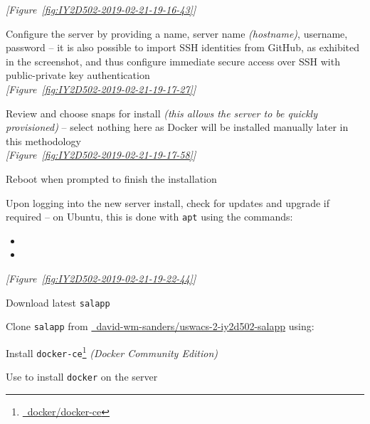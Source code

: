 \begin{methodology0}
\begin{methodology1}
      \textcolor{deep-gray}{\textit{[Figure~\ref{fig:IY2D502-2019-02-21-19-16-43}]}}
      \item Configure the server by providing a name, server name \textit{(hostname)}, username, password -- it is also possible to import SSH identities from GitHub, as exhibited in the screenshot, and thus configure immediate secure access over SSH with public-private key authentication\\
      \textcolor{deep-gray}{\textit{[Figure~\ref{fig:IY2D502-2019-02-21-19-17-27}]}}
      \item Review and choose snaps for install \textit{(this allows the server to be quickly provisioned)} -- select nothing here as Docker will be installed manually later in this methodology\\
      \textcolor{deep-gray}{\textit{[Figure~\ref{fig:IY2D502-2019-02-21-19-17-58}]}}
      \item Reboot when prompted to finish the installation
      \item Upon logging into the new server install, check for updates and upgrade if required -- on Ubuntu, this is done with \texttt{apt} using the commands:
        \begin{itemize}
          \item {}
          \item {}
        \end{itemize}
      \textcolor{deep-gray}{\textit{[Figure~\ref{fig:IY2D502-2019-02-21-19-22-44}]}}
    \end{methodology1}
  \pagebreak
  \item Download latest \texttt{salapp}
    \begin{methodology1}
      \item Clone \texttt{salapp} from \href{https://github.com/david-wm-sanders/uswacs-2-iy2d502-salapp}{\faGithub\ david-wm-sanders/uswacs-2-iy2d502-salapp} using:\\
    \end{methodology1}
  \item Install \texttt{docker-ce}\footnote{\href{https://github.com/docker/docker-ce}{\faGithub\ docker/docker-ce}} \textit{(Docker Community Edition)}
    \begin{methodology1}
      \item Use  to install \texttt{docker} on the server\\

\end{methodology1}
\end{methodology0}
